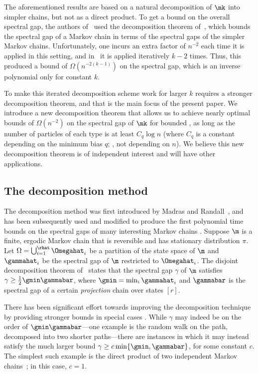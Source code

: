 The aforementioned results are based on a natural decomposition of 
$\mk$ into simpler chains, but not as a direct product. To get a bound 
on the overall spectral gap, the authors of~\cite{MS} used the 
decomposition theorem of~\cite{MR00}, which bounds the spectral gap of 
a Markov chain in terms of the spectral gaps of the simpler Markov 
chains. Unfortunately, one incurs an extra factor of $n^{-2}$ each time 
it is applied in this setting, and in~\cite{MS} it is applied 
iteratively $k-2$ times. Thus, this produced a bound
%
of $\Omega(n^{-2(k-1)})$ on the spectral gap,
which is an inverse polynomial only for constant $k$.

To make this iterated decomposition scheme work for larger $k$ requires 
a stronger decomposition theorem, and that is the main focus of the 
present paper. We introduce a new decomposition theorem that allows us 
to achieve nearly optimal bounds of $\Omega(n^{-2})$ on the spectral 
gap of $\mk$ for bounded \kPs, as long as the number of particles of 
each type is at least $C_q\log n$ (where $C_q$ is a constant depending 
on the minimum bias $q$; \ie,  not depending on $n$).  We believe this 
new decomposition theorem is of independent interest and will have 
other applications.  

\subsection{The decomposition method}

The decomposition method was first introduced by Madras and 
Randall~\cite{madr}, and has been subsequently used and modified to 
produce the first polynomial time bounds on the spectral gaps of many 
interesting Markov chains \cite{CDF00,Dest03,Ding2010, EMT18, 
GHS08,HW16, jstv04,mh15,MR00,mrs,PS17, R01}. Suppose $\m$ is a finite, 
ergodic Markov chain that is reversible and has stationary 
distribution $\pi$. Let
%
$\Omega=\bigcup_{i=1}^{\rhat}\Omegahat_i$  %
be a partition of the state space of $\m$ and $\gammahat_i$ 
be the spectral gap of $\m$ restricted to $\Omegahat_i$. The disjoint 
decomposition theorem of~\cite{MR00} states that the spectral gap 
$\gamma$ of $\m$ satisfies $\gamma \geq \frac{1}{2}\gmin\gammabar$, 
where $\gmin=\min_i \gammahat_i$ and $\gammabar$ is the spectral gap of 
a certain \emph{projection} chain over states $[r]$. 

There has been significant effort towards improving the decomposition 
technique by providing stronger bounds in special 
cases \cite{Dest03,EMT18,GHS08,jstv04,mh15,MR00,PS17,R01}. While 
$\gamma$ may indeed be on the order of $\gmin\gammabar$---one example 
is the random walk on the path, decomposed into two
%
shorter  %
paths---there are instances in which it may instead satisfy the much 
larger bound $\gamma \geq c \min\{\gmin, \gammabar\}$, for some 
constant $c$. The simplest such example is the direct product of two 
independent Markov chains~\cite{bmrs,EMT18}; in this case, $c=1$. 

